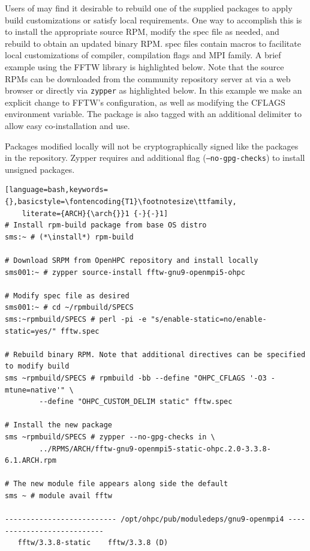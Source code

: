 Users of \OHPC{} may find it desirable to rebuild one of the supplied packages
to apply build customizations or satisfy local requirements. One way to
accomplish this is to install the appropriate source RPM, modify the spec file
as needed, and rebuild to obtain an updated binary RPM. \OHPC{} spec files
contain macros to facilitate local customizations of compiler, compilation
flags and MPI family. A brief example using
the FFTW library is highlighted below.  Note that the source RPMs can be downloaded from the
community repository server at \href{http://repos.openhpc.community}
{\color{blue}{http://repos.openhpc.community}} via a web browser or directly
via \texttt{zypper} as highlighted below. In this example we make an explicit
change to FFTW's configuration, as well as modifying the CFLAGS environment
variable. The package is also tagged with an additional delimiter to allow easy
co-installation and use. 

\begin{center}
\begin{tcolorbox}[]
\small
Packages modified locally will not be cryptographically signed like the packages
    in the \OHPC{} repository. Zypper requires and additional flag
    (\texttt{--no-gpg-checks}) to install unsigned packages.
\end{tcolorbox}
\end{center}

\begin{lstlisting}[language=bash,keywords={},basicstyle=\fontencoding{T1}\footnotesize\ttfamily,
    literate={ARCH}{\arch{}}1 {-}{-}1]
# Install rpm-build package from base OS distro
sms:~ # (*\install*) rpm-build

# Download SRPM from OpenHPC repository and install locally
sms001:~ # zypper source-install fftw-gnu9-openmpi5-ohpc

# Modify spec file as desired
sms001:~ # cd ~/rpmbuild/SPECS
sms:~rpmbuild/SPECS # perl -pi -e "s/enable-static=no/enable-static=yes/" fftw.spec

# Rebuild binary RPM. Note that additional directives can be specified to modify build
sms ~rpmbuild/SPECS # rpmbuild -bb --define "OHPC_CFLAGS '-O3 -mtune=native'" \
        --define "OHPC_CUSTOM_DELIM static" fftw.spec

# Install the new package
sms ~rpmbuild/SPECS # zypper --no-gpg-checks in \
        ../RPMS/ARCH/fftw-gnu9-openmpi5-static-ohpc.2.0-3.3.8-6.1.ARCH.rpm

# The new module file appears along side the default
sms ~ # module avail fftw

-------------------------- /opt/ohpc/pub/moduledeps/gnu9-openmpi4 ---------------------------
   fftw/3.3.8-static    fftw/3.3.8 (D)
\end{lstlisting}
